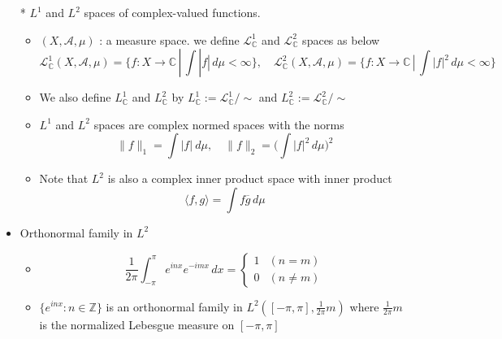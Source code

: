 \documentclass[12pt]{article}
\newcommand{\A}{\mathcal{A}}
\newcommand{\LL}{\mathcal{L}}
\begin{document}
\begin{itemize}
\begin{itemize}
\begin{enumerate}
        \end{enumerate}
    \end{itemize}
    \item[*] $L^1$ and $L^2$ spaces of complex-valued functions.
    \begin{itemize}
        \item $(X, \A, \mu)$ : a measure space. we define $\LL_{\mathbb{C}}^1$ and $\LL_{\mathbb{C}}^2$ spaces as below \begin{equation*}
            \LL_{\mathbb{C}}^1(X, \A, \mu)=\big\{f:X\rightarrow \mathbb{C}\, |\, \int |f| \, d\mu<\infty  \big\}, \quad \LL_{\mathbb{C}}^2(X, \A,\mu) =\big\{f:X\rightarrow \mathbb{C}\, |\, \int |f|^2 \, d\mu<\infty  \big\}
        \end{equation*}
        \item We also define $L_{\mathbb{C}}^1$ and $L_{\mathbb{C}}^2$ by $L_{\mathbb{C}}^1:=\LL_{\mathbb{C}}^1 /\sim$ and $L_{\mathbb{C}}^2:=\LL_{\mathbb{C}}^2 /\sim$
        \item $L^1$ and $L^2$ spaces are complex normed spaces with the norms \begin{equation*}
            \|f\|_1=\int |f| \ d\mu, \quad \|f\|_2=\Big(\int |f|^2\, d\mu\Big)^2
        \end{equation*}
        \item Note that $L^2$ is also a complex inner product space with inner product \begin{equation*} \langle f, g \rangle = \int f\overline{g}\, d\mu \end{equation*}
    \end{itemize}
    \item Orthonormal family in $L^2$
    \begin{itemize}
        \item \begin{equation*}
            \frac{1}{2\pi} \int_{-\pi}^\pi e^{inx}e^{-imx}\, dx = \begin{cases}
                1 & (n=m) \\ 0 & (n\neq m)
            \end{cases}
        \end{equation*}
        \item $\{e^{inx} : n\in \mathbb{Z}\}$ is an orthonormal family in $L^2([-\pi, \pi], \frac{1}{2\pi}m)$ where $\frac{1}{2\pi}m$ is the normalized Lebesgue measure on $[-\pi, \pi]$
    \end{itemize}
\end{itemize}
\smallskip
\end{document}
